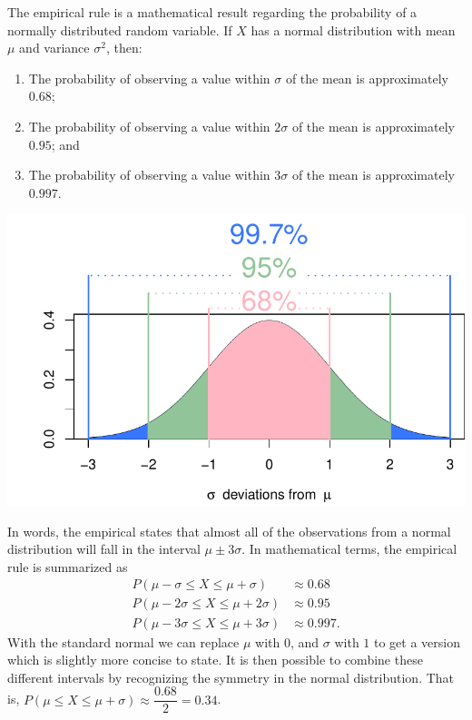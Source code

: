\documentclass[
  letterpaper,
  DIV=11,
  numbers=noendperiod]{scrreprt}
\providecommand{\tightlist}{%
  \setlength{\itemsep}{0pt}\setlength{\parskip}{0pt}}\usepackage{longtable,booktabs,array}
\theoremstyle{definition}
\theoremstyle{definition}
\theoremstyle{definition}
\theoremstyle{remark}
\begin{document}
\begin{tcolorbox}[enhanced jigsaw, coltitle=black, colframe=quarto-callout-tip-color-frame, colbacktitle=quarto-callout-tip-color!10!white, bottomrule=.15mm, opacitybacktitle=0.6, colback=white, toptitle=1mm, arc=.35mm, leftrule=.75mm, bottomtitle=1mm, opacityback=0, breakable, rightrule=.15mm, title={The Empirical Rule}, left=2mm, titlerule=0mm, toprule=.15mm]

The empirical rule is a mathematical result regarding the probability of
a normally distributed random variable. If \(X\) has a normal
distribution with mean \(\mu\) and variance \(\sigma^2\), then:

\begin{enumerate}
\def\labelenumi{\arabic{enumi}.}
\tightlist
\item
  The probability of observing a value within \(\sigma\) of the mean is
  approximately \(0.68\);
\item
  The probability of observing a value within \(2\sigma\) of the mean is
  approximately \(0.95\); and
\item
  The probability of observing a value within \(3\sigma\) of the mean is
  approximately \(0.997\).
\end{enumerate}

\includegraphics{notes/chapter9_files/figure-pdf/empirical_rule-1.pdf}

\end{tcolorbox}

In words, the empirical states that almost all of the observations from
a normal distribution will fall in the interval \(\mu\pm3\sigma\). In
mathematical terms, the empirical rule is summarized as \begin{align*}
    P(\mu-\sigma\leq X \leq \mu + \sigma) &\approx 0.68 \\ 
    P(\mu - 2\sigma \leq X \leq \mu + 2\sigma) &\approx 0.95 \\ 
    P(\mu - 3\sigma \leq X \leq \mu + 3\sigma) &\approx 0.997. 
\end{align*} With the standard normal we can replace \(\mu\) with \(0\),
and \(\sigma\) with \(1\) to get a version which is slightly more
concise to state. It is then possible to combine these different
intervals by recognizing the symmetry in the normal distribution. That
is, \(P(\mu \leq X \leq \mu + \sigma) \approx \dfrac{0.68}{2} = 0.34\).
\end{document}
